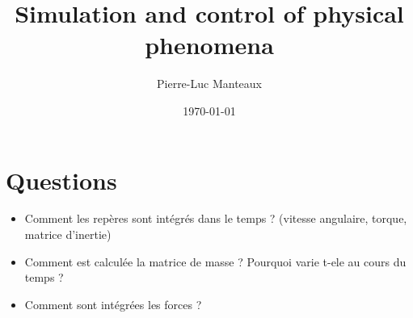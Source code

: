 \documentclass[11pt, oneside, a4paper]{memoir}
\begin{document}
\title{Simulation and control of physical phenomena}
\author{Pierre-Luc Manteaux}
\date{\today}
\maketitle

\frontmatter
\chapter{Questions}
\begin{itemize}
\item Comment les repères sont intégrés dans le temps ? (vitesse angulaire, torque, matrice d'inertie)
\item Comment est calculée la matrice de masse ? Pourquoi varie t-ele au cours du temps ?
\item Comment sont intégrées les forces ?
\end{itemize}


\tableofcontents

\mainmatter









\backmatter
\printbibliography
\listoffigures
\listofalgorithms
\listoftables
\end{document}
